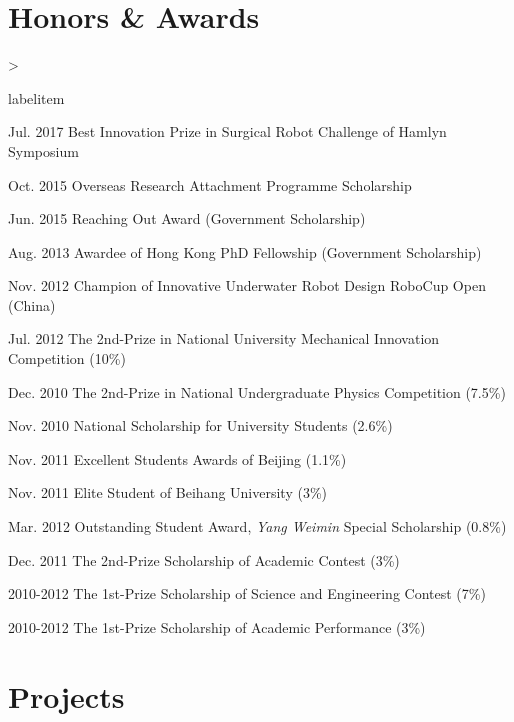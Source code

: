 \documentclass[10pt,letterpaper]{article}
\makeatletter
\newenvironment{dateitemize}%
{\ifnum \@itemdepth >\thr@@\@toodeep\else
\advance\@itemdepth\@ne
\edef\@itemitem{labelitem\romannumeral\the\@itemdepth}%
\expandafter
\list
\csname\@itemitem\endcsname
{\advance\rightmargin3cm
\def\makelabel##1{\hss\llap{\textbullet}\rlap{\hbox to \dimexpr\linewidth+\rightmargin+\itemsep\relax{\hss##1}}}}%
\fi}
{\endlist}%
\makeatother
\begin{document}
    \section*{Honors \& Awards}

    \begin{dateitemize}
        \item[Jul. 2017] Best Innovation Prize in Surgical Robot Challenge of Hamlyn Symposium
        \item[Oct. 2015] Overseas Research Attachment Programme Scholarship
        \item[Jun. 2015] Reaching Out Award (Government Scholarship)
        \item[Aug. 2013] Awardee of Hong Kong PhD Fellowship (Government Scholarship)
        \item[Nov. 2012] Champion of Innovative Underwater Robot Design RoboCup Open (China)
        \item[Jul. 2012] The 2nd-Prize in National University Mechanical Innovation Competition (10\%)
        \item[Dec. 2010] The 2nd-Prize in National Undergraduate Physics Competition (7.5\%)
        \item[Nov. 2010] National Scholarship for University Students (2.6\%)
        \item[Nov. 2011] Excellent Students Awards of Beijing (1.1\%)
        \item[Nov. 2011] Elite Student of Beihang University (3\%)
        \item[Mar. 2012] Outstanding Student Award, \textit{Yang Weimin} Special Scholarship (0.8\%)
        \item[Dec. 2011] The 2nd-Prize Scholarship of Academic Contest (3\%)
        \item[2010-2012] The 1st-Prize Scholarship of Science and Engineering Contest (7\%)
        \item[2010-2012] The 1st-Prize Scholarship of Academic Performance (3\%)

    \end{dateitemize}

    \section*{Projects}
\end{document}
